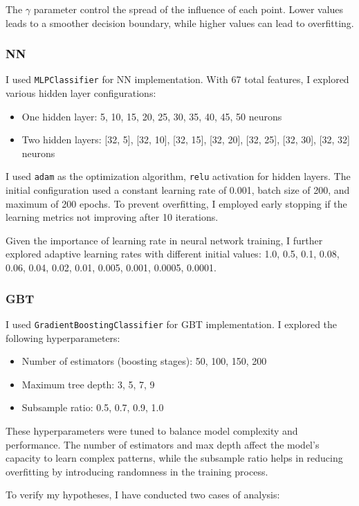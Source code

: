 \documentclass[conference]{IEEEtran}
\begin{document}
The $\gamma$ parameter control the spread of the influence of each point. Lower values leads to a smoother decision boundary, while higher values can lead to overfitting.

\subsubsection{NN \label{sec:nn}}
I used \verb|MLPClassifier| for NN implementation. With 67 total features, I explored various hidden layer configurations:
\begin{itemize}
    \item One hidden layer: 5, 10, 15, 20, 25, 30, 35, 40, 45, 50 neurons
    \item Two hidden layers: [32, 5], [32, 10], [32, 15], [32, 20], [32, 25], [32, 30], [32, 32] neurons
\end{itemize}

I used \verb|adam| as the optimization algorithm, \verb|relu| activation for hidden layers. The initial configuration used a constant learning rate of 0.001, batch size of 200, and maximum of 200 epochs. To prevent overfitting, I employed early stopping if the learning metrics not improving after 10 iterations.

Given the importance of learning rate in neural network training, I further explored adaptive learning rates with different initial values: 1.0, 0.5, 0.1, 0.08, 0.06, 0.04, 0.02, 0.01, 0.005, 0.001, 0.0005, 0.0001.

\subsubsection{GBT \label{sec:gbt}}
I used \verb|GradientBoostingClassifier| for GBT implementation. I explored the following hyperparameters:
\begin{itemize}
    \item Number of estimators (boosting stages): 50, 100, 150, 200
    \item Maximum tree depth: 3, 5, 7, 9
    \item Subsample ratio: 0.5, 0.7, 0.9, 1.0
\end{itemize}

These hyperparameters were tuned to balance model complexity and performance. The number of estimators and max depth affect the model's capacity to learn complex patterns, while the subsample ratio helps in reducing overfitting by introducing randomness in the training process.

To verify my hypotheses, I have conducted two cases of analysis:
\end{document}
